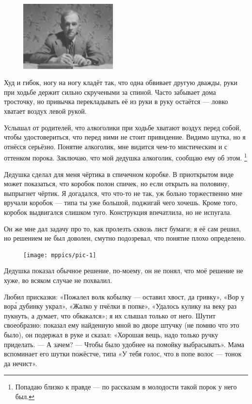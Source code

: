 \documentclass{book}
\begin{document}
\begin{figure}
\vskip-0mm
\centering
\includegraphics[width=49mm,angle=0]{pics/deda-tolya}
\end{figure}

Худ и гибок, ногу на ногу кладёт так, что одна обвивает другую дважды,
руки при ходьбе держит сильно скручеными за спиной.
Часто забывает дома тросточку, но привычка перекладывать её из руки в руку остаётся --- ловко хватает воздух левой рукой.

Услышал от родителей, что алкоголики при ходьбе хватают воздух перед собой, чтобы удостовериться,
что перед ними не стоит привидение.
Видимо шутка, но я отнёсся серьёзно.
Понятие алкоголик, мне видится чем-то мистическим и с оттенком порока.
Заключаю, что мой дедушка алкоголик, сообщаю ему об этом.%
\footnote{Попадаю близко к правде --- по рассказам в молодости такой порок у него был.}

Дедушка сделал для меня чёртика в спичечном коробке.
В приоткрытом виде может показаться, что коробок полон спичек,
но если открыть на половину, выпрыгнет чёртик.
Я  догадался, что что-то не так, уж больно торжественно мне вручали коробок --- типа ты уже большой, поджигай чего хочешь.
Кроме того, коробок выдвигался слишком туго.
Конструкция впечатлила, но не испугала.

Он же мне дал задачу про то, как пролезть сквозь лист бумаги;
я её сам решил, но решением не был доволен, смутно подозревал, что понятие  плохо определено.
\begin{figure}[ht!]
\vskip-0mm
\centering
\texttt{[image: mppics/pic-1]}
\end{figure}
Дедушка показал обычное решение, по-моему, он не понял, что моё решение не хуже, во всяком случае не похвалил.

Любил присказки: «Пожалел волк кобылку --- оставил хвост, да гривку», «Вор у вор\'{а} дубинку украл», «Жалко у пчёлки в попке», «Удалось кулику на веку раз пукнуть, а думает, что обкакался»; я их слышал только от него.
Шутит своеобразно: показал ему найденную мной во дворе штучку (не помню что это было), он подержал в руке и сказал: «Хорошая вещь, надо только ручку приделать.
--- А зачем? --- Чтобы было удобнее на помойку выбрасывать».
Мама вспоминает его шутки пожёстче, типа «У тебя голос, что в попе волос --- тонок да нечист».
\end{document}
